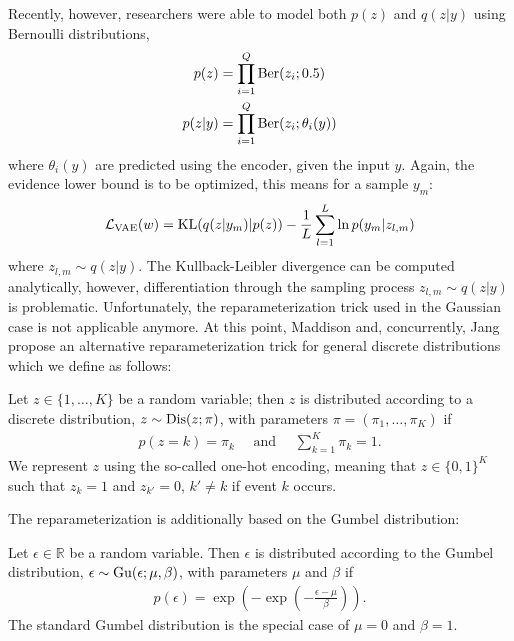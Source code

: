 Recently, however, researchers \cite{MaddisonMnihTeh:2016,JangGuPoole:2016}
were able to model both $p(z)$ and $q(z|y)$ using Bernoulli distributions,
\ie
\begin{align}
  p(z) &= \prod_{i = 1}^Q \mathrm{Ber}(z_i; 0.5)\\
  p(z | y) &= \prod_{i = 1}^Q \mathrm{Ber}(z_i; \theta_i(y))
\end{align}
where $\theta_i(y)$ are predicted using the encoder, given the input $y$.
Again, the evidence lower bound is to be optimized, this means for a sample $y_m$:
\begin{align}
  \mathcal{L}_{\text{VAE}} (w) = \mathrm{KL}(q(z|y_m) | p(z))
	- \frac{1}{L}\sum_{l = 1}^L \ln p(y_m | z_{l,m})
\end{align}
where $z_{l,m} \sim q(z|y)$. The Kullback-Leibler divergence can be
computed analytically, however, differentiation
through the sampling process $z_{l,m} \sim q(z | y)$
is problematic. Unfortunately, the reparameterization trick used in
the Gaussian case is not applicable anymore.
At this point, Maddison \etal \cite{MaddisonMnihTeh:2016} and, concurrently, Jang \etal
\cite{JangGuPoole:2016} propose an alternative reparameterization trick
for general discrete distributions which we define as follows:

\begin{definition}
  Let $z \in \{1,\ldots,K\}$ be a random variable; then $z$ is distributed
  according to a discrete distribution, \ie $z \sim \mathrm{Dis}(z; \pi)$,
  with parameters $\pi = (\pi_1, \ldots, \pi_K)$ if
  \begin{align}
    p(z = k) = \pi_k\quad\text{ and }\quad \sum_{k = 1}^K \pi_k = 1.
  \end{align}
  We represent $z$ using the so-called one-hot encoding, meaning that
  $z \in \{0,1\}^K$ such that $z_k = 1$ and $z_{k'} = 0$, $k' \neq k$
  if event $k$ occurs.
\end{definition}

The reparameterization is additionally based on the Gumbel distribution:

\begin{definition}
  Let $\epsilon \in \mathbb{R}$ be a random variable. Then $\epsilon$
  is distributed according to the Gumbel distribution,
  \ie $\epsilon \sim \mathrm{Gu}(\epsilon; \mu, \beta)$,
  with parameters $\mu$ and $\beta$ if
  \begin{align}
    p(\epsilon) = \exp\left(- \exp\left(-\frac{\epsilon - \mu}{\beta}\right)\right).
  \end{align}
  The standard Gumbel distribution is
  the special case of $\mu = 0$ and $\beta = 1$.
\end{definition}


